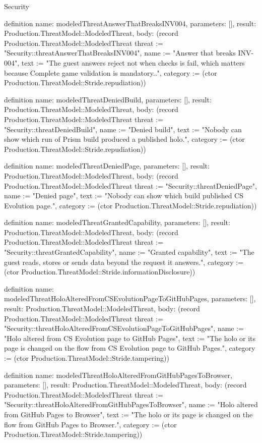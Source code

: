 \begin{lexlean}{Security}
\begin{semanticmodule}
definition{
  name: modeledThreatAnswerThatBreaksINV004,
  parameters: [],
  result: Production.ThreatModel::ModeledThreat,
  body: (record Production.ThreatModel::ModeledThreat {threat := "Security::threatAnswerThatBreaksINV004", name := "Answer that breaks INV-004", text := "The guest answers reject not when checks is fail, which matters because Complete game validation is mandatory..", category := (ctor Production.ThreatModel::Stride.repudiation)})
}

definition{
  name: modeledThreatDeniedBuild,
  parameters: [],
  result: Production.ThreatModel::ModeledThreat,
  body: (record Production.ThreatModel::ModeledThreat {threat := "Security::threatDeniedBuild", name := "Denied build", text := "Nobody can show which run of Prism build produced a published holo.", category := (ctor Production.ThreatModel::Stride.repudiation)})
}

definition{
  name: modeledThreatDeniedPage,
  parameters: [],
  result: Production.ThreatModel::ModeledThreat,
  body: (record Production.ThreatModel::ModeledThreat {threat := "Security::threatDeniedPage", name := "Denied page", text := "Nobody can show which build published CS Evolution page.", category := (ctor Production.ThreatModel::Stride.repudiation)})
}

definition{
  name: modeledThreatGrantedCapability,
  parameters: [],
  result: Production.ThreatModel::ModeledThreat,
  body: (record Production.ThreatModel::ModeledThreat {threat := "Security::threatGrantedCapability", name := "Granted capability", text := "The guest reads, stores or sends data beyond the request it answers.", category := (ctor Production.ThreatModel::Stride.informationDisclosure)})
}

definition{
  name: modeledThreatHoloAlteredFromCSEvolutionPageToGitHubPages,
  parameters: [],
  result: Production.ThreatModel::ModeledThreat,
  body: (record Production.ThreatModel::ModeledThreat {threat := "Security::threatHoloAlteredFromCSEvolutionPageToGitHubPages", name := "Holo altered from CS Evolution page to GitHub Pages", text := "The holo or its page is changed on the flow from CS Evolution page to GitHub Pages.", category := (ctor Production.ThreatModel::Stride.tampering)})
}

definition{
  name: modeledThreatHoloAlteredFromGitHubPagesToBrowser,
  parameters: [],
  result: Production.ThreatModel::ModeledThreat,
  body: (record Production.ThreatModel::ModeledThreat {threat := "Security::threatHoloAlteredFromGitHubPagesToBrowser", name := "Holo altered from GitHub Pages to Browser", text := "The holo or its page is changed on the flow from GitHub Pages to Browser.", category := (ctor Production.ThreatModel::Stride.tampering)})
}


\end{semanticmodule}
\end{lexlean}
